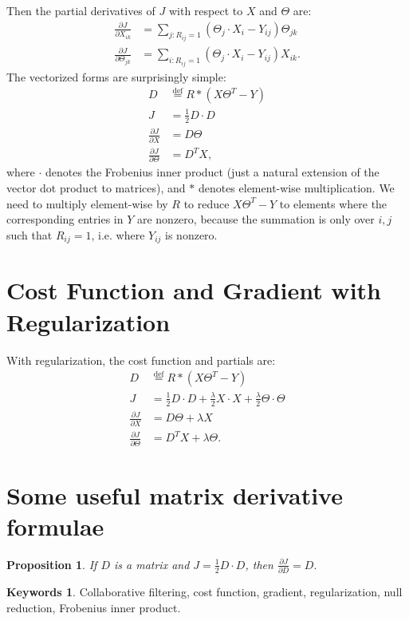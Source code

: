 \documentclass[12pt]{article}
\theoremstyle{plain}
\newtheorem{prop}[thm]{Proposition}
\theoremstyle{definition}
\newtheorem*{keywords}{Keywords}
\theoremstyle{remark}
\newcommand{\defeq}{\overset{\mathrm{def}}{=}}
\begin{document}
Then the partial derivatives of $J$ with respect to $X$ and $\Theta$ are: 
\begin{align*}
\frac{\partial J}{\partial X_{ik}} &= \sum_{j:R_{ij}=1} (\Theta_j \cdot X_i - Y_{ij}) \Theta_{jk} \\
\frac{\partial J}{\partial \Theta_{jk}} &= \sum_{i:R_{ij}=1} (\Theta_j \cdot X_i - Y_{ij}) X_{ik}.
\end{align*}
The vectorized forms are surprisingly simple:
\begin{align*}
D &\defeq R * (X \Theta^T - Y) \\
J &= \frac{1}{2}D \cdot D \\
\frac{\partial J}{\partial X} &= D \Theta \\
\frac{\partial J}{\partial \Theta} &= D^T X,
\end{align*}
where $\cdot$ denotes the Frobenius inner product (just a natural extension of the vector dot product to matrices), and $*$ denotes element-wise multiplication. We need to multiply element-wise by $R$ to reduce $X\Theta^T - Y$ to elements where the corresponding entries in $Y$ are nonzero, because the summation is only over $i,j$ such that $R_{ij} = 1$, i.e. where $Y_{ij}$ is nonzero.

\section{Cost Function and Gradient with Regularization}

With regularization, the cost function and partials are: 
\begin{align*}
D &\defeq R * (X \Theta^T - Y) \\
J &= \frac{1}{2}D \cdot D + \frac{\lambda}{2} X \cdot X + \frac{\lambda}{2} \Theta \cdot \Theta \\
\frac{\partial J}{\partial X} &= D \Theta + \lambda X \\
\frac{\partial J}{\partial \Theta} &= D^T X + \lambda \Theta.
\end{align*}

\section{Some useful matrix derivative formulae}

\begin{prop}
If $D$ is a matrix and $J = \frac{1}{2} D \cdot D$, then $\frac{\partial J}{\partial D} = D.$
\end{prop}

\begin{keywords}
Collaborative filtering, cost function, gradient, regularization, null reduction, Frobenius inner product.
\end{keywords}
\end{document}
